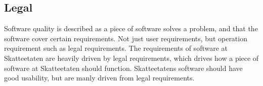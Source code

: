 



\subsection{Legal} \label{sec:legal}
Software quality is described as a piece of software solves a problem, and that the software cover certain requirements. Not just user requirements, but operation requirement such as legal requirements. The requirements of software at Skatteetaten are heavily driven by legal requirements, which drives how a piece of software at Skatteetaten should function. Skatteetatens software should have good usability, but are manly driven from legal requirements.

